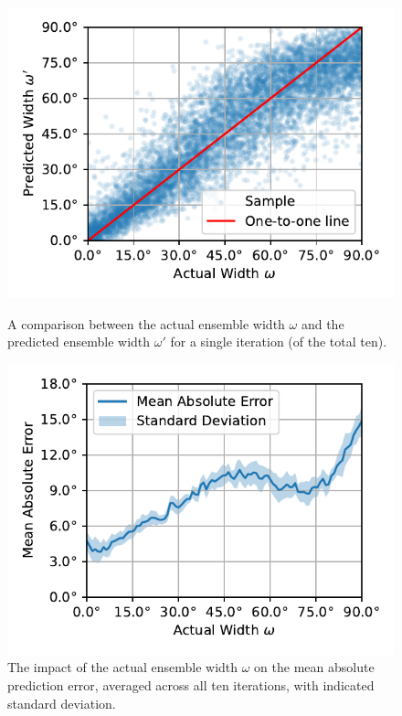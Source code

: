 \documentclass[11pt]{article}
\begin{document}
\begin{figure}[ht!]
  \centering
  \begin{minipage}[]{0.45\linewidth}
    \includegraphics[width=\linewidth]{../figures/actual_vs_predicted_width.pdf}
    \caption{\label{fig:actual_vs_predicted_width}A comparison between the actual ensemble width $\omega$ and the predicted ensemble width $\omega'$ for a single iteration (of the total ten). }
  \end{minipage}
  \hspace{0.5cm}
  \begin{minipage}[]{0.45\linewidth}
    \includegraphics[width=\linewidth]{../figures/mae_width.pdf}
    \caption{\label{fig:mae_width}The impact of the actual ensemble width $\omega$ on the mean absolute prediction error, averaged across all ten iterations, with indicated standard deviation.}
  \end{minipage}
\end{figure}
\end{document}
